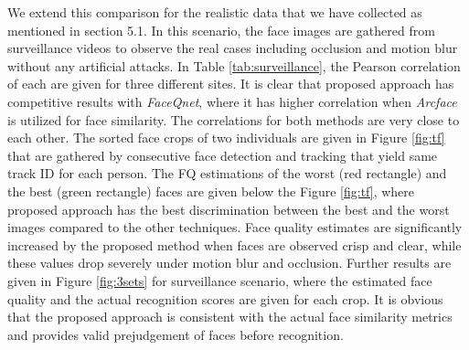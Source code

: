 \documentclass[runningheads]{llncs}
\begin{document}
We extend this comparison for the realistic data that we have collected as mentioned in section 5.1. In this scenario, the face images are gathered from surveillance videos to observe the real cases including occlusion and motion blur without any artificial attacks. In Table \ref{tab:surveillance}, the Pearson correlation of each are given for three different sites. It is clear that proposed approach has competitive results with \textit{FaceQnet}, where it has higher correlation when \textit{Arcface} is utilized for face similarity. The correlations for both methods are very close to each other. The sorted face crops of two individuals are given in Figure \ref{fig:tf} that are gathered by consecutive face detection and tracking that yield same track ID for each person. The FQ estimations of the worst (red rectangle) and the best (green rectangle) faces are given below the Figure \ref{fig:tf}, where proposed approach has the best discrimination between the best and the worst images compared to the other techniques. Face quality estimates are significantly increased by the proposed method when faces are observed crisp and clear, while these values drop severely under motion blur and occlusion. Further results are given in Figure \ref{fig:3sets} for surveillance scenario, where the estimated face quality and the actual recognition scores are given for each crop. It is obvious that the proposed approach is consistent with the actual face similarity metrics and provides valid prejudgement of faces before recognition.
\end{document}
